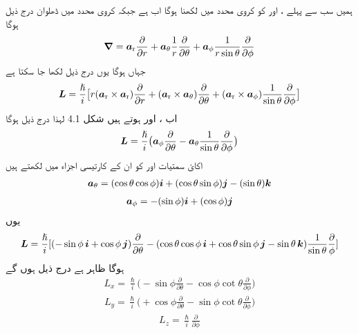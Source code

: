 
ہمیں سب سے پہلے ،   اور  کو کروی محدد میں لکھنا ہوگا اب   ہے جبکہ کروی محدد میں ڈھلوان درج ذیل ہوگا 
\begin{align}
{\ensuremath{{\boldsymbol{\nabla}}}} = {\boldsymbol{a}}_{\textup{r}} \frac{\partial}{\partial r} + {\boldsymbol{a}}_{\theta} \frac{1}{r} \frac{\partial}{\partial \theta} + {\boldsymbol{a}}_{\phi} \frac{1}{r \sin {\theta}} \frac{\partial}{\partial \phi}
\end{align}
جہاں  ہوگا یوں درج ذیل لکھا جا سکتا ہے 
\begin{align*}
{\ensuremath{{\boldsymbol{L}}}} = \frac{\hslash}{i} \big [ r ({\boldsymbol{a}}_{\textup{r}} \times {\boldsymbol{a}}_{\textup{r}}) \frac{\partial}{\partial r} + ({\boldsymbol{a}}_{\textup{r}} \times {\boldsymbol{a}}_{\theta}) \frac{\partial}{\partial \theta} + ({\boldsymbol{a}}_{\textup{r}} \times {\boldsymbol{a}}_{\phi}) \frac{1}{\sin \theta} \frac{\partial}{\partial \phi} \big ]
\end{align*}
اب ،   اور  ہوتے ہیں شکل 4.1 لہذا درج ذیل ہوگا 
\begin{align}
{\ensuremath{{\boldsymbol{L}}}} = \frac{\hslash}{i} \big ( {\boldsymbol{a}}_{\phi} \frac{\partial}{\partial \theta} - {\boldsymbol{a}}_{\theta} \frac{1}{\sin \theta} \frac{\partial}{\partial \phi} \big )
\end{align}
اکائ سمتیات  اور  کو ان کے کارتیسی اجزاء میں لکھتے ہیں 
\begin{align}
{\boldsymbol{a}}_{\theta} = (\cos \theta \cos \phi) {\boldsymbol{i}} + (\cos \theta \sin \phi) {\boldsymbol{j}} - (\sin \theta) {\boldsymbol{k}}
\end{align}
\begin{align}
{\boldsymbol{a}}_{\phi} = - (\sin \phi) {\boldsymbol{i}} + (\cos \phi) {\boldsymbol{j}}
\end{align}
یوں 
\begin{align*}
{\ensuremath{{\boldsymbol{L}}}} = \frac{\hslash}{i} [(- \sin \phi \,{\boldsymbol{i}} + \cos \phi\, {\boldsymbol{j}}) \frac{\partial}{\partial \theta} - (\cos \theta \cos \phi \,{\boldsymbol{i}} + \cos \theta \sin \phi \,{\boldsymbol{j}} - \sin \theta \,{\boldsymbol{k}}) \frac{1}{\sin \theta} \frac{\partial}{\phi}]
\end{align*}
ہوگا ظاہر ہے درج ذیل ہوں گے 
\begin{align}
L_x = \frac{\hslash}{i} \big ( - \sin \phi \frac{\partial}{\partial \theta} - \cos \phi \cot \theta \frac{\partial}{\partial \phi} \big )
\end{align}
\begin{align}
L_y = \frac{\hslash}{i} \big ( + \cos \phi \frac{\partial}{\partial \theta} - \sin \phi \cot \theta \frac{\partial}{\partial \phi} \big )
\end{align} 
\begin{align}
L_z = \frac{\hslash}{i} \frac{\partial}{\partial \phi}
\end{align} 

